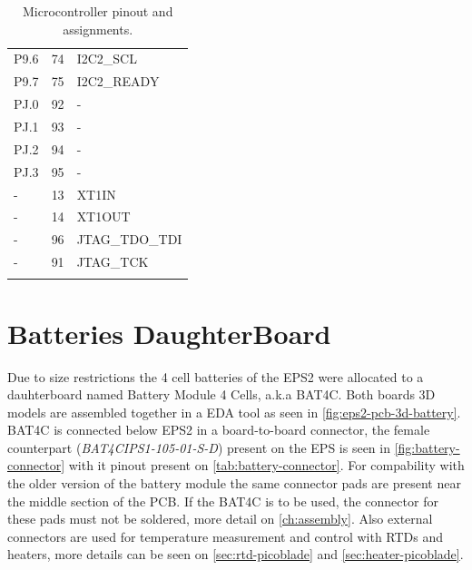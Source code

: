 \begin{longtable}{lcl}
    P9.6              & 74                  & I2C2\_SCL             \\
    P9.7              & 75                  & I2C2\_READY           \\
    \midrule
    PJ.0              & 92                  & -                     \\
    PJ.1              & 93                  & -                     \\
    PJ.2              & 94                  & -                     \\
    PJ.3              & 95                  & -                     \\
    \midrule
    -                 & 13                  & XT1IN                 \\
    -                 & 14                  & XT1OUT                \\
    -                 & 96                  & JTAG\_TDO\_TDI        \\
    -                 & 91                  & JTAG\_TCK             \\
    \bottomrule[1.5pt]
    \caption{Microcontroller pinout and assignments.}
    \label{tab:mcu-pinout}
\end{longtable}

\section{Batteries DaughterBoard}

Due to size restrictions the 4 cell batteries of the EPS2 were allocated to a dauhterboard named Battery Module 4 Cells, a.k.a BAT4C\cite{bat4c}. Both boards 3D models are assembled together in a EDA tool as seen in \autoref{fig:eps2-pcb-3d-battery}. BAT4C is connected below EPS2 in a board-to-board connector, the female counterpart (\textit{BAT4CIPS1-105-01-S-D}) present on the EPS is seen in \autoref{fig:battery-connector} with it pinout present on \autoref{tab:battery-connector}. For compability with the older version of the battery module the same connector pads are present near the middle section of the PCB. If the BAT4C is to be used, the connector for these pads must not be soldered, more detail on \autoref{ch:assembly}. Also external connectors are used for temperature measurement and control with RTDs and heaters, more details can be seen on \autoref{sec:rtd-picoblade} and \autoref{sec:heater-picoblade}. 

